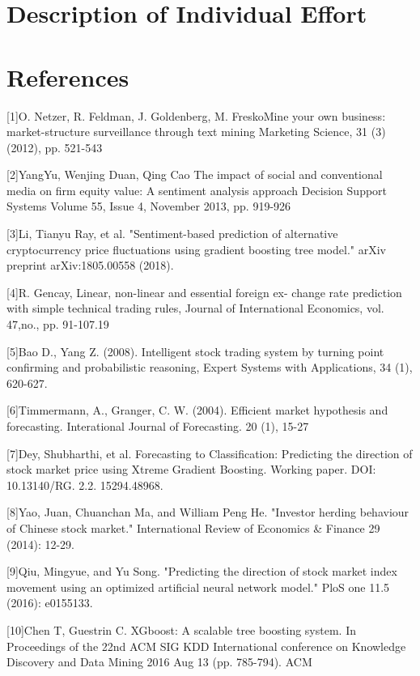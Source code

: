 \documentclass[letterpaper]{article}
\begin{document}
\section{Description of Individual Effort}

\section*{References}
[1]O. Netzer, R. Feldman, J. Goldenberg, M. FreskoMine your own business: market-structure surveillance through text mining
Marketing Science, 31 (3) (2012), pp. 521-543

[2]YangYu, Wenjing Duan, Qing Cao The impact of social and conventional media on firm equity value: A sentiment analysis approach 
Decision Support Systems Volume 55, Issue 4, November 2013, pp. 919-926

[3]Li, Tianyu Ray, et al. "Sentiment-based prediction of alternative cryptocurrency price fluctuations using gradient boosting tree model." arXiv preprint arXiv:1805.00558 (2018). 

[4]R. Gencay, Linear, non-linear and essential foreign ex-
change rate prediction with simple technical trading rules,
Journal of International Economics, vol. 47,no., pp. 91-107.19

[5]Bao D., Yang Z. (2008). Intelligent stock trading system by turning point confirming and probabilistic reasoning, Expert Systems with Applications, 34 (1), 620-627.

[6]Timmermann, A., Granger, C. W. (2004). Efficient market hypothesis and forecasting. Interational Journal of Forecasting. 20 (1), 15-27 

[7]Dey, Shubharthi, et al. Forecasting to Classification: Predicting the direction of stock market price using Xtreme Gradient Boosting. Working paper. DOI: 10.13140/RG. 2.2. 15294.48968.

[8]Yao, Juan, Chuanchan Ma, and William Peng He. "Investor herding behaviour of Chinese stock market." International Review of Economics \& Finance 29 (2014): 12-29.

[9]Qiu, Mingyue, and Yu Song. "Predicting the direction of stock market index movement using an optimized artificial neural network model." PloS one 11.5 (2016): e0155133.

[10]Chen T, Guestrin C. XGboost: A scalable tree boosting system. In Proceedings of the 22nd ACM SIG KDD International conference on Knowledge Discovery and Data Mining 2016 Aug 13 (pp. 785-794). ACM
\end{document}
